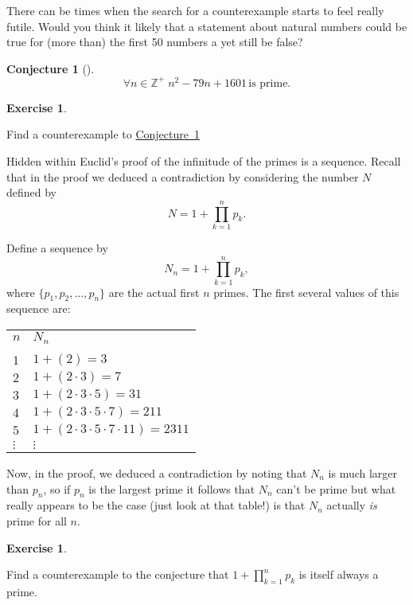 \documentclass[10pt,]{book}
\theoremstyle{plain}
\newtheorem{conjecture}[theorem]{Conjecture}
\theoremstyle{definition}
\theoremstyle{definition}
\newtheorem{exercise}[theorem]{Exercise}
\numberwithin{equation}{section}
\newcommand{\hrulethin}  {\noalign{\hrule height 0.04em}}
\newcommand{\Integers}{{\mathbb Z}}
\begin{document}
    There can be times when the search for a counterexample starts to feel
    really futile. Would you think it likely that a statement about
    natural numbers could be true for (more than) the first 50 numbers
    a yet still be false?
\begin{conjecture}[{}]\label{conj_prim2}
\begin{equation*}
      \forall n \in \Integers^+ \; n^2 - 79n + 1601 \, \mbox{is prime.}
    \end{equation*}\end{conjecture}
\begin{exercise}\label{exercise-22}

        Find a counterexample to \hyperref[conj_prim2]{Conjecture~\ref{conj_prim2}}
\end{exercise}
\par

    Hidden within Euclid's proof of the infinitude of the primes is
    a sequence. Recall that in the proof we deduced a contradiction
    by considering the number \(N\) defined by
    \begin{equation*}
      N = 1 + \prod_{k=1}^n p_k.
    \end{equation*}
\par

    Define a sequence by
    \begin{equation*}
      N_n  = 1 + \prod_{k=1}^n p_k,
    \end{equation*}
    where \(\{p_1, p_2, \ldots , p_n\}\) are the actual first \(n\) primes.
    The first several values of this sequence are:
\begin{tabular}{ll}
\(n\)&\(N_n\)\tabularnewline[0pt]
&\tabularnewline\hrulethin
\(1\)&\(1+(2) = 3\)\tabularnewline[0pt]
\(2\)&\(1+(2\cdot 3) = 7\)\tabularnewline[0pt]
\(3\)&\(1+(2\cdot 3\cdot 5) = 31\)\tabularnewline[0pt]
\(4\)&\(1+(2\cdot 3\cdot 5\cdot 7) = 211\)\tabularnewline[0pt]
\(5\)&\(1+(2\cdot 3\cdot 5\cdot 7\cdot 11) = 2311\)\tabularnewline[0pt]
\(\vdots\)&\(\vdots\)
\end{tabular}
\par

    Now, in the proof, we deduced a contradiction by noting that \(N_n\) is
    much larger than \(p_n\), so if \(p_n\) is the largest prime it follows that
    \(N_n\) can't be prime \textemdash{} but what really appears to be the case (just look
    at that table!) is that \(N_n\) actually \emph{is} prime for all \(n\).
\begin{exercise}\label{exercise-23}

        Find a counterexample to the conjecture that \(1+\prod_{k=1}^n p_k\)
        is itself always a prime.
\end{exercise}
\typeout{************************************************}
\typeout{************************************************}
\end{document}
